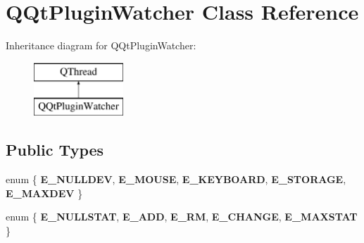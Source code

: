 \hypertarget{class_q_qt_plugin_watcher}{}\section{Q\+Qt\+Plugin\+Watcher Class Reference}
\label{class_q_qt_plugin_watcher}
Inheritance diagram for Q\+Qt\+Plugin\+Watcher\+:\begin{figure}[H]
\begin{center}
\leavevmode
\includegraphics[height=2.000000cm]{class_q_qt_plugin_watcher}
\end{center}
\end{figure}
\subsection*{Public Types}
\begin{DoxyCompactItemize}
\item 
\mbox{\label{class_q_qt_plugin_watcher_a54bea1e81b64d020f6a40178fb22a81f}} 
enum \{ \newline
{\bfseries E\+\_\+\+N\+U\+L\+L\+D\+EV}, 
{\bfseries E\+\_\+\+M\+O\+U\+SE}, 
{\bfseries E\+\_\+\+K\+E\+Y\+B\+O\+A\+RD}, 
{\bfseries E\+\_\+\+S\+T\+O\+R\+A\+GE}, 
\newline
{\bfseries E\+\_\+\+M\+A\+X\+D\+EV}
 \}
\item 
\mbox{\label{class_q_qt_plugin_watcher_a9cd5a5882a6002c7659cf353a84749a3}} 
enum \{ \newline
{\bfseries E\+\_\+\+N\+U\+L\+L\+S\+T\+AT}, 
{\bfseries E\+\_\+\+A\+DD}, 
{\bfseries E\+\_\+\+RM}, 
{\bfseries E\+\_\+\+C\+H\+A\+N\+GE}, 
\newline
{\bfseries E\+\_\+\+M\+A\+X\+S\+T\+AT}
 \}
\end{DoxyCompactItemize}
